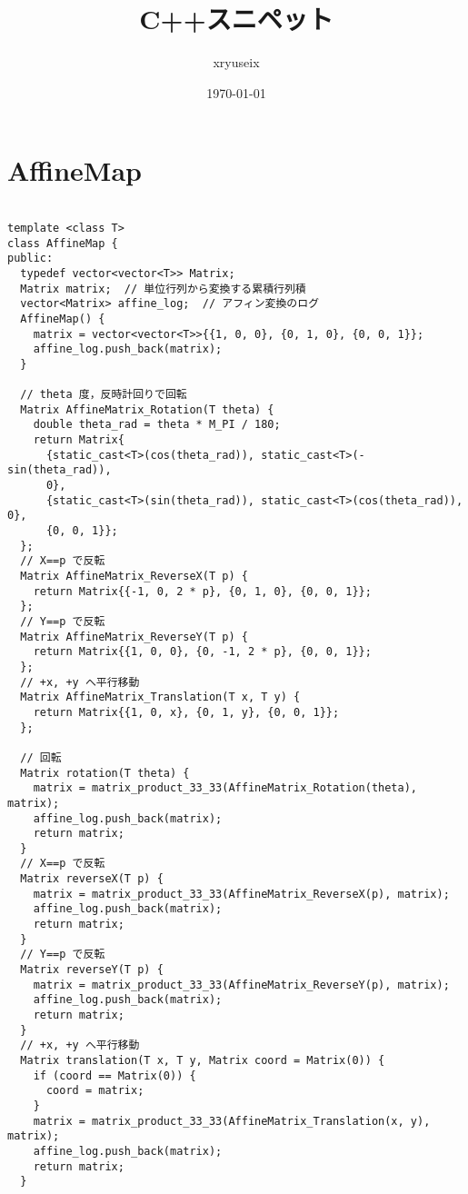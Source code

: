 \documentclass{jsarticle}
\title{C++スニペット}
\author{xryuseix}
\date{\today}
\begin{document}
\maketitle

\tableofcontents %
\clearpage



\color{white}
\section{AffineMap}
\color{black}
\begin{lstlisting}[caption=AffineMap]

template <class T>
class AffineMap {
public:
  typedef vector<vector<T>> Matrix;
  Matrix matrix;  // 単位行列から変換する累積行列積
  vector<Matrix> affine_log;  // アフィン変換のログ
  AffineMap() {
    matrix = vector<vector<T>>{{1, 0, 0}, {0, 1, 0}, {0, 0, 1}};
    affine_log.push_back(matrix);
  }

  // theta 度，反時計回りで回転
  Matrix AffineMatrix_Rotation(T theta) {
    double theta_rad = theta * M_PI / 180;
    return Matrix{
      {static_cast<T>(cos(theta_rad)), static_cast<T>(-sin(theta_rad)),
      0},
      {static_cast<T>(sin(theta_rad)), static_cast<T>(cos(theta_rad)), 0},
      {0, 0, 1}};
  };
  // X==p で反転
  Matrix AffineMatrix_ReverseX(T p) {
    return Matrix{{-1, 0, 2 * p}, {0, 1, 0}, {0, 0, 1}};
  };
  // Y==p で反転
  Matrix AffineMatrix_ReverseY(T p) {
    return Matrix{{1, 0, 0}, {0, -1, 2 * p}, {0, 0, 1}};
  };
  // +x, +y へ平行移動
  Matrix AffineMatrix_Translation(T x, T y) {
    return Matrix{{1, 0, x}, {0, 1, y}, {0, 0, 1}};
  };

  // 回転
  Matrix rotation(T theta) {
    matrix = matrix_product_33_33(AffineMatrix_Rotation(theta), matrix);
    affine_log.push_back(matrix);
    return matrix;
  }
  // X==p で反転
  Matrix reverseX(T p) {
    matrix = matrix_product_33_33(AffineMatrix_ReverseX(p), matrix);
    affine_log.push_back(matrix);
    return matrix;
  }
  // Y==p で反転
  Matrix reverseY(T p) {
    matrix = matrix_product_33_33(AffineMatrix_ReverseY(p), matrix);
    affine_log.push_back(matrix);
    return matrix;
  }
  // +x, +y へ平行移動
  Matrix translation(T x, T y, Matrix coord = Matrix(0)) {
    if (coord == Matrix(0)) {
      coord = matrix;
    }
    matrix = matrix_product_33_33(AffineMatrix_Translation(x, y), matrix);
    affine_log.push_back(matrix);
    return matrix;
  }


\end{lstlisting}
\end{document}
